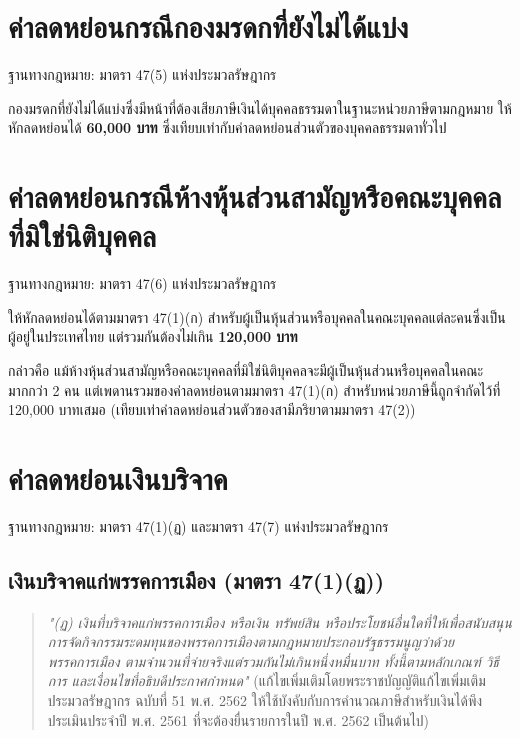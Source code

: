 \documentclass[12pt,a4paper]{article}
\newcommand{\hilight}[1]{\textbf{#1}}
\begin{document}
\section{ค่าลดหย่อนกรณีกองมรดกที่ยังไม่ได้แบ่ง}

ฐานทางกฎหมาย: มาตรา 47(5) แห่งประมวลรัษฎากร

กองมรดกที่ยังไม่ได้แบ่งซึ่งมีหน้าที่ต้องเสียภาษีเงินได้บุคคลธรรมดาในฐานะหน่วยภาษีตามกฎหมาย ให้หักลดหย่อนได้ \hilight{60,000 บาท} ซึ่งเทียบเท่ากับค่าลดหย่อนส่วนตัวของบุคคลธรรมดาทั่วไป

\section{ค่าลดหย่อนกรณีห้างหุ้นส่วนสามัญหรือคณะบุคคลที่มิใช่นิติบุคคล}

ฐานทางกฎหมาย: มาตรา 47(6) แห่งประมวลรัษฎากร

ให้หักลดหย่อนได้ตามมาตรา 47(1)(ก) สำหรับผู้เป็นหุ้นส่วนหรือบุคคลในคณะบุคคลแต่ละคนซึ่งเป็นผู้อยู่ในประเทศไทย แต่รวมกันต้องไม่เกิน \hilight{120,000 บาท}

กล่าวคือ แม้ห้างหุ้นส่วนสามัญหรือคณะบุคคลที่มิใช่นิติบุคคลจะมีผู้เป็นหุ้นส่วนหรือบุคคลในคณะมากกว่า 2 คน แต่เพดานรวมของค่าลดหย่อนตามมาตรา 47(1)(ก) สำหรับหน่วยภาษีนี้ถูกจำกัดไว้ที่ 120,000 บาทเสมอ (เทียบเท่าค่าลดหย่อนส่วนตัวของสามีภริยาตามมาตรา 47(2))

\newpage
\section{ค่าลดหย่อนเงินบริจาค}

ฐานทางกฎหมาย: มาตรา 47(1)(ฏ) และมาตรา 47(7) แห่งประมวลรัษฎากร

\subsection*{เงินบริจาคแก่พรรคการเมือง (มาตรา 47(1)(ฏ))}

\begin{quote}
\textit{"(ฏ) เงินที่บริจาคแก่พรรคการเมือง หรือเงิน ทรัพย์สิน หรือประโยชน์อื่นใดที่ให้เพื่อสนับสนุนการจัดกิจกรรมระดมทุนของพรรคการเมืองตามกฎหมายประกอบรัฐธรรมนูญว่าด้วยพรรคการเมือง ตามจำนวนที่จ่ายจริงแต่รวมกันไม่เกินหนึ่งหมื่นบาท ทั้งนี้ตามหลักเกณฑ์ วิธีการ และเงื่อนไขที่อธิบดีประกาศกำหนด"} (แก้ไขเพิ่มเติมโดยพระราชบัญญัติแก้ไขเพิ่มเติมประมวลรัษฎากร ฉบับที่ 51 พ.ศ. 2562 ให้ใช้บังคับกับการคำนวณภาษีสำหรับเงินได้พึงประเมินประจำปี พ.ศ. 2561 ที่จะต้องยื่นรายการในปี พ.ศ. 2562 เป็นต้นไป)
\end{quote}
\end{document}
